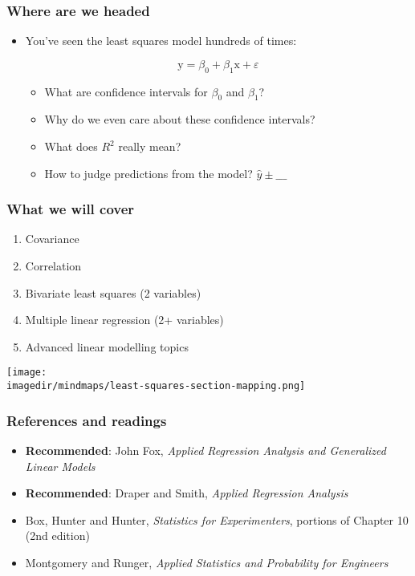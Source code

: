 \begin{frame}\frametitle{Where are we headed}
	\begin{itemize}
		\item	You've seen the least squares model hundreds of times:
		
		\begin{exampleblock}{}
			$$\mathrm{y} = \beta_0 + \beta_1 \mathrm{x} + \varepsilon$$
		\end{exampleblock}

		\begin{itemize}
			\item	What are confidence intervals for $\beta_0$ and $\beta_1$?
			\item	Why do we even care about these confidence intervals?
			\item	What does $R^2$ really mean?
			\item	How to judge predictions from the model? $\hat{y} \pm \_\_\_$
		\end{itemize}
	\end{itemize}
\end{frame}

\begin{frame}\frametitle{What we will cover}
	\begin{enumerate}
		\item	Covariance
		\item	Correlation
		\item	Bivariate least squares (2 variables)
		\item	Multiple linear regression (2+ variables)
		\item	Advanced linear modelling topics
	\end{enumerate}
	\begin{center}
		\texttt{[image: \\imagedir/mindmaps/least-squares-section-mapping.png]}
	\end{center}
\end{frame}

\begin{frame}\frametitle{References and readings}
	\begin{itemize}
		\item	\textbf{Recommended}: John Fox, \emph{Applied Regression Analysis and Generalized Linear Models}
		\item	\textbf{Recommended}: Draper and Smith, \emph{Applied Regression Analysis}
		\item	Box, Hunter and Hunter, \emph{Statistics for Experimenters}, portions of Chapter 10 (2nd edition)
		\item	Montgomery and Runger, \emph{Applied Statistics and Probability for Engineers}
	\end{itemize}
\end{frame}

